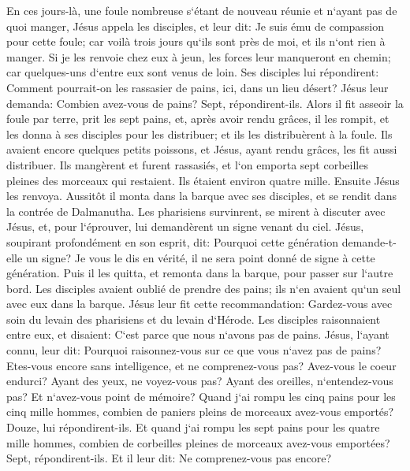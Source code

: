 \verse En ces jours-là, une foule nombreuse s`étant de nouveau réunie et n`ayant pas de quoi manger, Jésus appela les disciples, et leur dit: 
\verse Je suis ému de compassion pour cette foule; car voilà trois jours qu`ils sont près de moi, et ils n`ont rien à manger. 
\verse Si je les renvoie chez eux à jeun, les forces leur manqueront en chemin; car quelques-uns d`entre eux sont venus de loin. 
\verse Ses disciples lui répondirent: Comment pourrait-on les rassasier de pains, ici, dans un lieu désert? 
\verse Jésus leur demanda: Combien avez-vous de pains? Sept, répondirent-ils. 
\verse Alors il fit asseoir la foule par terre, prit les sept pains, et, après avoir rendu grâces, il les rompit, et les donna à ses disciples pour les distribuer; et ils les distribuèrent à la foule. 
\verse Ils avaient encore quelques petits poissons, et Jésus, ayant rendu grâces, les fit aussi distribuer. 
\verse Ils mangèrent et furent rassasiés, et l`on emporta sept corbeilles pleines des morceaux qui restaient. 
\verse Ils étaient environ quatre mille. Ensuite Jésus les renvoya. 
\verse Aussitôt il monta dans la barque avec ses disciples, et se rendit dans la contrée de Dalmanutha. 
\verse Les pharisiens survinrent, se mirent à discuter avec Jésus, et, pour l`éprouver, lui demandèrent un signe venant du ciel. 
\verse Jésus, soupirant profondément en son esprit, dit: Pourquoi cette génération demande-t-elle un signe? Je vous le dis en vérité, il ne sera point donné de signe à cette génération. 
\verse Puis il les quitta, et remonta dans la barque, pour passer sur l`autre bord. 
\verse Les disciples avaient oublié de prendre des pains; ils n`en avaient qu`un seul avec eux dans la barque. 
\verse Jésus leur fit cette recommandation: Gardez-vous avec soin du levain des pharisiens et du levain d`Hérode. 
\verse Les disciples raisonnaient entre eux, et disaient: C`est parce que nous n`avons pas de pains. 
\verse Jésus, l`ayant connu, leur dit: Pourquoi raisonnez-vous sur ce que vous n`avez pas de pains? Etes-vous encore sans intelligence, et ne comprenez-vous pas? 
\verse Avez-vous le coeur endurci? Ayant des yeux, ne voyez-vous pas? Ayant des oreilles, n`entendez-vous pas? Et n`avez-vous point de mémoire? 
\verse Quand j`ai rompu les cinq pains pour les cinq mille hommes, combien de paniers pleins de morceaux avez-vous emportés? Douze, lui répondirent-ils. 
\verse Et quand j`ai rompu les sept pains pour les quatre mille hommes, combien de corbeilles pleines de morceaux avez-vous emportées? Sept, répondirent-ils. 
\verse Et il leur dit: Ne comprenez-vous pas encore? 
